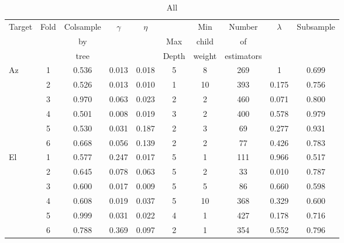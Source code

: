 \begin{table}[!htbp]
    \centering
    \caption{All}
    \begin{tabular}{lccccccccc}
        \toprule
        \multirow{3}{*}{Target} & \multirow{3}{*}{Fold} &  Colsample &  \multirow{3}{*}{$\gamma$} &  \multirow{3}{*}{$\eta$} &   &  Min &  Number &  \multirow{3}{*}{$\lambda$} &  \multirow{3}{*}{Subsample} \\
        & & by   & & & Max   & child  & of         & & \\
        & & tree & & & Depth & weight & estimators & & \\
        \midrule
        \multirow{6}{*}{Az} &   1 &   0.536 &  0.013 &          0.018 &      5 &             8 &       269 &       1 &      0.699 \\
                            &   2 &   0.526 &  0.013 &          0.010 &      1 &            10 &       393 &       0.175 &      0.756 \\
                            &   3 &   0.970 &  0.063 &          0.023 &      2 &             2 &       460 &       0.071 &      0.800 \\
                            &   4 &   0.501 &  0.008 &          0.019 &      3 &             2 &       400 &       0.578 &      0.979 \\
                            &   5 &   0.530 &  0.031 &          0.187 &      2 &             3 &        69 &       0.277 &      0.931 \\
                            &   6 &   0.668 &  0.056 &          0.139 &      2 &             2 &        77 &       0.426 &      0.783 \\
        \hline
        \multirow{6}{*}{El} &   1 &   0.577 &  0.247 &          0.017 &      5 &             1 &       111 &       0.966 &      0.517 \\
                            &   2 &   0.645 &  0.078 &          0.063 &      5 &             2 &        33 &       0.010 &      0.787 \\
                            &   3 &   0.600 &  0.017 &          0.009 &      5 &             5 &        86 &       0.660 &      0.598 \\
                            &   4 &   0.608 &  0.019 &          0.037 &      5 &            10 &       368 &       0.329 &      0.600 \\
                            &   5 &   0.999 &  0.031 &          0.022 &      4 &             1 &       427 &       0.178 &      0.716 \\
                            &   6 &   0.788 &  0.369 &          0.097 &      2 &             1 &       354 &       0.552 &      0.796 \\
        \bottomrule
        \end{tabular}
\end{table}

